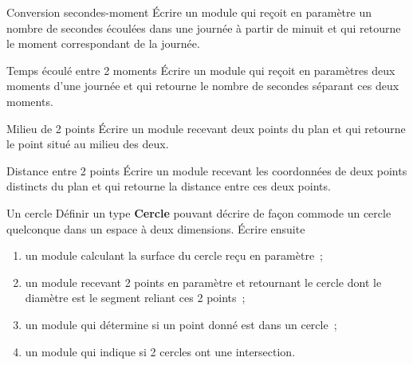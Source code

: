 \begin{Exercice}{Conversion secondes-moment}
	Écrire un module qui reçoit en paramètre un
	nombre de secondes écoulées dans une journée à partir de minuit et qui
	retourne le moment correspondant de la journée.
\end{Exercice}

\begin{Exercice}{Temps écoulé entre 2 moments}
	Écrire un module qui reçoit en paramètres deux
	moments d’une journée et qui retourne le nombre de secondes séparant
	ces deux moments.
\end{Exercice}

\begin{Exercice}{Milieu de 2 points}
	Écrire un module recevant deux points du plan 
	et qui retourne le point situé au milieu des deux.
\end{Exercice}

\begin{Exercice}{Distance entre 2 points}
	Écrire un module recevant les coordonnées de
	deux points distincts du plan et qui retourne
	la distance entre ces deux points.
\end{Exercice}

\begin{Exercice}{Un cercle}
	Définir un type \textbf{Cercle} pouvant décrire de façon
	commode un cercle quelconque dans un espace à deux dimensions. 	
	Écrire ensuite

	\begin{enumerate}[label=\alph*)]
		\item {
			un module calculant la surface du cercle reçu en paramètre~;}
		\item {
				un module recevant 2 points en paramètre et retournant le cercle dont le
			diamètre est le segment reliant ces 2 points~;}
		\item {
			un module qui détermine si un point donné est dans un cercle~;}
		\item {
				un module qui indique si 2 cercles ont une intersection.
			}
	\end{enumerate}
\end{Exercice}


